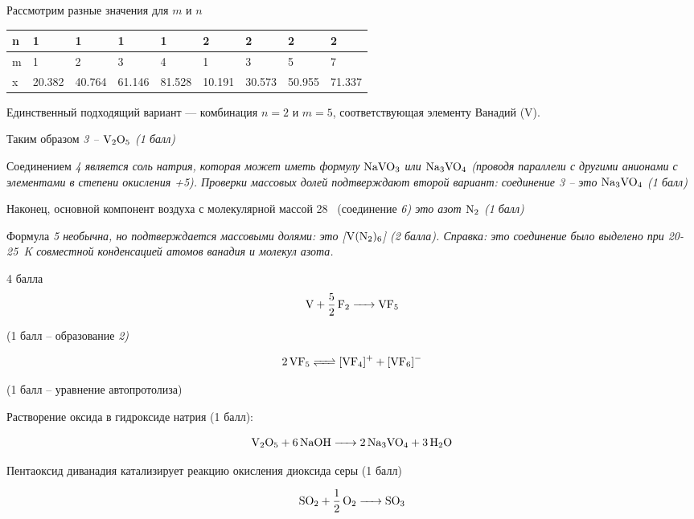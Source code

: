 \begin{emptysolbox}
  Рассмотрим разные значения для $m$ и $n$
  
  \begin{tabularx}{\textwidth}{|X|X|X|X|X|X|X|X|X|}
    \hline
    n & 1 & 1 & 1 & 1 & 2 & 2 & 2 & 2 \\
    \hline
    m & 1 & 2 & 3 & 4 & 1 & 3 & 5 & 7 \\
    \hline
    x & 20.382 & 40.764 & 61.146 & 81.528 & 10.191 & 30.573 & 50.955 & 71.337 \\
    \hline
  \end{tabularx}

  Единственный подходящий вариант — комбинация $n = 2$ и $m = 5$, соответствующая элементу Ванадий (V).

  Таким образом \em{3} – $\ce{V2O5}$ (1 балл)

  Соединением \em{4} является соль натрия, которая может иметь формулу $\ce{NaVO3}$ или $\ce{Na3VO4}$ (проводя параллели с другими анионами с элементами в степени окисления +5). Проверки массовых долей подтверждают второй вариант: соединение \em{3} – это $\ce{Na3VO4}$ (1 балл)

  Наконец, основной компонент воздуха с молекулярной массой 28~\unit{\gmol} (соединение \em{6}) это азот $\ce{N2}$ (1 балл)

  Формула \em{5} необычна, но подтверждается массовыми долями: это [$\ce{V(N2)6}$] (2 балла). Справка: это соединение было выделено при 20-25~\unit{\kelvin} совместной конденсацией атомов ванадия и молекул азота.
\end{emptysolbox}



\begin{solbox}{4 балла}
  \begin{equation*}
    \ce{V + \frac{5}{2} F2 -> VF5}
  \end{equation*}

  (1 балл – образование \em{2})

  \begin{equation*}
    \ce{2VF5 <=> [VF4]+ + [VF6]-}
  \end{equation*}

  (1 балл – уравнение автопротолиза)

  Растворение оксида в гидроксиде натрия (1 балл):

  \begin{equation*}
    \ce{V2O5 + 6NaOH -> 2Na3VO4 + 3H2O}
  \end{equation*}

  Пентаоксид диванадия катализирует реакцию окисления диоксида серы (1 балл)

  \begin{equation*}
    \ce{SO2 + \frac{1}{2} O2 -> SO3}
  \end{equation*}
\end{solbox}



